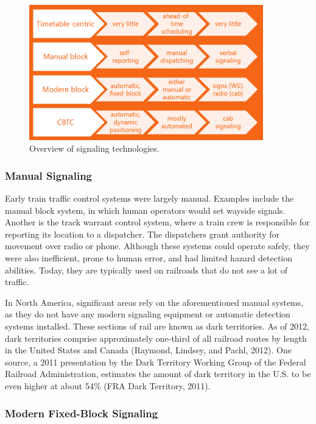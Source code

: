 \documentclass[11pt, titlepage]{article}
\begin{document}
\begin{figure}[ht]
    \begin{center}
        \includegraphics[width=4in]{SignalingTechnologies.png}
        \caption{Overview of signaling technologies.}
    \end{center}
\end{figure}

\subsubsection{Manual Signaling}

Early train traffic control systems were largely manual. Examples include the
manual block system, in which human operators would set wayside signals. Another is
the track warrant control system, where a train crew is responsible for reporting
its location to a dispatcher. The dispatchers grant authority for movement over
radio or phone. Although these systems could operate safely, they were also
inefficient, prone to human error, and had limited hazard detection abilities.
Today, they are typically used on railroads that do not see a lot of traffic.

In North America, significant areas rely on the aforementioned manual systems, as
they do not have any modern signaling equipment or automatic detection systems
installed. These sections of rail are known as dark territories. As of 2012, dark
territories comprise approximately one-third of all railroad routes by length in
the United States and Canada (Raymond, Lindsey, and Pachl, 2012). One source, a 2011
presentation by the Dark Territory Working Group of the Federal Railroad
Administration, estimates the amount of dark territory in the U.S. to be even higher
at about 54\% (FRA Dark Territory, 2011).

\subsubsection{Modern Fixed-Block Signaling}
\end{document}
